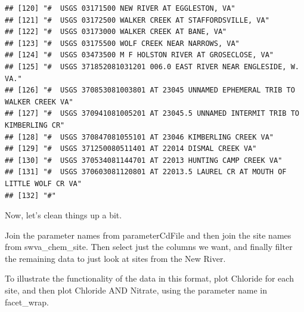 \documentclass[
]{book}
\begin{document}
\begin{verbatim}
## [120] "#  USGS 03171500 NEW RIVER AT EGGLESTON, VA"                                                                                                  
## [121] "#  USGS 03172500 WALKER CREEK AT STAFFORDSVILLE, VA"                                                                                          
## [122] "#  USGS 03173000 WALKER CREEK AT BANE, VA"                                                                                                    
## [123] "#  USGS 03175500 WOLF CREEK NEAR NARROWS, VA"                                                                                                 
## [124] "#  USGS 03473500 M F HOLSTON RIVER AT GROSECLOSE, VA"                                                                                         
## [125] "#  USGS 371852081031201 006.0 EAST RIVER NEAR ENGLESIDE, W. VA."                                                                              
## [126] "#  USGS 370853081003801 AT 23045 UNNAMED EPHEMERAL TRIB TO WALKER CREEK VA"                                                                   
## [127] "#  USGS 370941081005201 AT 23045.5 UNNAMED INTERMIT TRIB TO KIMBERLING CR"                                                                    
## [128] "#  USGS 370847081055101 AT 23046 KIMBERLING CREEK VA"                                                                                         
## [129] "#  USGS 371250080511401 AT 22014 DISMAL CREEK VA"                                                                                             
## [130] "#  USGS 370534081144701 AT 22013 HUNTING CAMP CREEK VA"                                                                                       
## [131] "#  USGS 370603081120801 AT 22013.5 LAUREL CR AT MOUTH OF LITTLE WOLF CR VA"                                                                   
## [132] "#"
\end{verbatim}

Now, let's clean things up a bit.

Join the parameter names from parameterCdFile and then join the site names from swva\_chem\_site. Then select just the columns we want, and finally filter the remaining data to just look at sites from the New River.

To illustrate the functionality of the data in this format, plot Chloride for each site, and then plot Chloride AND Nitrate, using the parameter name in facet\_wrap.
\end{document}
